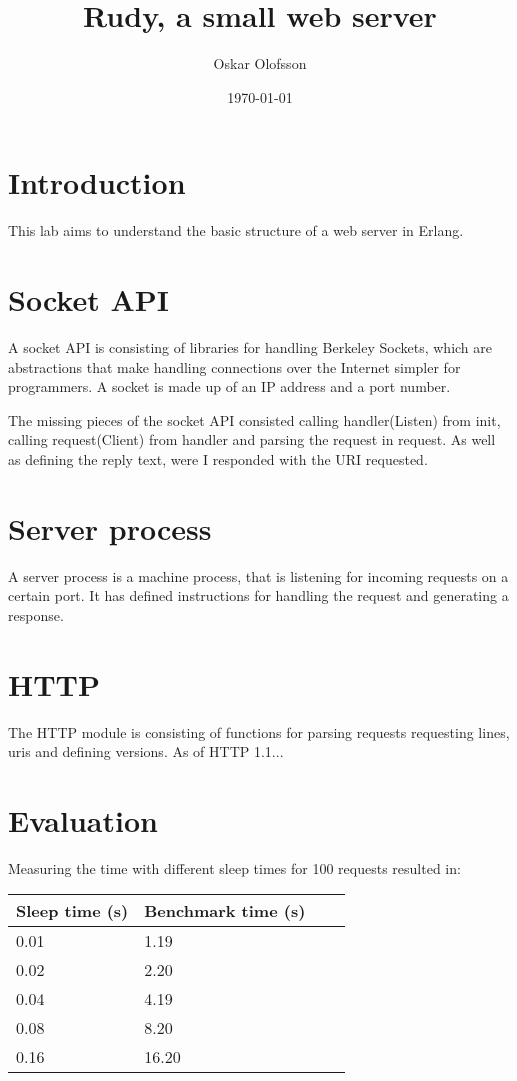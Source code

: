 \documentclass[a4paper]{article}
\title{Rudy, a small web server}
\author{Oskar Olofsson}
\date{\today}
\begin{document}
\maketitle

\section{Introduction}
This lab aims to understand the basic structure of a web server in Erlang.

\section{Socket API}
A socket API is consisting of libraries for handling Berkeley Sockets, which are abstractions that make handling connections over the Internet simpler for programmers. A socket is made up of an IP address and a port number.

The missing pieces of the socket API consisted calling handler(Listen) from init, calling request(Client) from handler and parsing the request in request. As well as defining the reply text, were I responded with the URI requested.

\section{Server process}
A server process is a machine process, that is listening for incoming requests on a certain port. It has defined instructions for handling the request and generating a response.

\section{HTTP}
The HTTP module is consisting of functions for parsing requests requesting lines, uris and defining versions. As of HTTP 1.1...

\section{Evaluation}
Measuring the time with different sleep times for 100 requests resulted in:

\begin{center}
    \begin{tabular}{| l | l | l | l |}
    \hline
    Sleep time (s) & Benchmark time (s) \\ \hline
    0.01 & 1.19 \\ \hline
    0.02 & 2.20 \\ \hline
    0.04 & 4.19 \\ \hline
    0.08 & 8.20 \\ \hline
    0.16 & 16.20 \\
    \hline
    \end{tabular}
\end{center}
\end{document}
